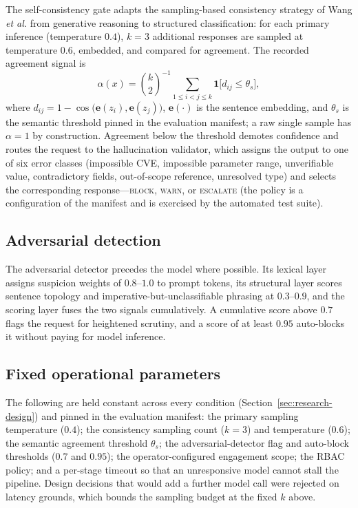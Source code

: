 The self-consistency gate adapts the sampling-based consistency strategy of
Wang \emph{et al.} from generative reasoning to structured classification: for
each primary inference (temperature $0.4$), $k=3$ additional responses are
sampled at temperature $0.6$, embedded, and compared for agreement. The recorded
agreement signal is
\begin{equation}
\alpha(x)=\binom{k}{2}^{-1}\sum_{1\le i<j\le k}
\mathbf{1}\big[d_{ij}\le\theta_s\big],
\label{eq:agreement-signal}
\end{equation}
where $d_{ij}=1-\cos\big(\mathbf{e}(z_i),\mathbf{e}(z_j)\big)$, $\mathbf{e}(\cdot)$
is the sentence embedding, and $\theta_s$ is the semantic threshold pinned in the
evaluation manifest; a raw single sample has $\alpha=1$ by construction.
Agreement below the threshold demotes confidence and routes the request to the
hallucination validator, which assigns the output to one of six error classes
(impossible CVE, impossible parameter range, unverifiable value, contradictory
fields, out-of-scope reference, unresolved type) and selects the corresponding
response---\textsc{block}, \textsc{warn}, or \textsc{escalate} (the policy is a
configuration of the manifest and is exercised by the automated test suite).

\subsection*{Adversarial detection}

The adversarial detector precedes the model where possible. Its lexical layer
assigns suspicion weights of $0.8$--$1.0$ to prompt tokens, its structural layer
scores sentence topology and imperative-but-unclassifiable phrasing at
$0.3$--$0.9$, and the scoring layer fuses the two signals cumulatively. A
cumulative score above $0.7$ flags the request for heightened scrutiny, and a
score of at least $0.95$ auto-blocks it without paying for model inference.

\subsection*{Fixed operational parameters}

The following are held constant across every condition (Section~\ref{sec:research-design})
and pinned in the evaluation manifest: the primary sampling temperature ($0.4$);
the consistency sampling count ($k=3$) and temperature ($0.6$); the semantic
agreement threshold $\theta_s$; the adversarial-detector flag and auto-block
thresholds ($0.7$ and $0.95$); the operator-configured engagement scope; the RBAC
policy; and a per-stage timeout so that an unresponsive model cannot stall the
pipeline. Design decisions that would add a further model call were rejected on
latency grounds, which bounds the sampling budget at the fixed $k$ above.


